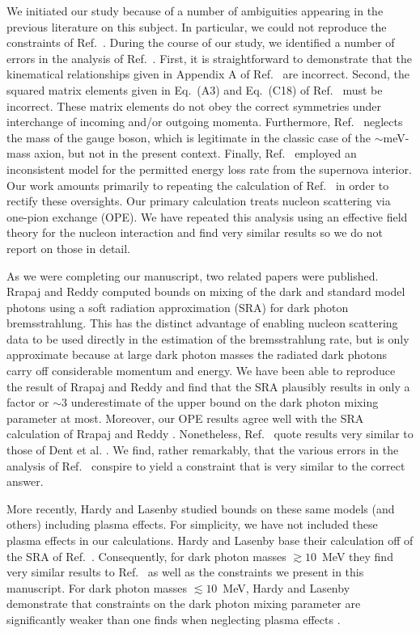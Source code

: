 \documentclass[nofootinbib,prd,superscriptaddress,twocolumn]{revtex4}
\begin{document}
We initiated our study because of a number of ambiguities appearing in the previous literature on this subject. 
In particular, we could not reproduce the constraints of Ref.~\cite{dent_etal12}. During the course of our 
study, we identified a number of errors in the analysis of Ref.~\cite{dent_etal12}. First, it is straightforward 
to demonstrate that the kinematical relationships given in Appendix A of Ref.~\cite{dent_etal12} are 
incorrect. Second, the squared matrix elements given in Eq.~(A3) and Eq.~(C18) of Ref.~\cite{dent_etal12} must 
be incorrect. These matrix elements do not obey the correct symmetries under interchange of incoming 
and/or outgoing momenta. Furthermore, Ref.~\cite{dent_etal12} neglects the mass of the gauge boson, which 
is legitimate in the classic case of the $\sim$meV-mass axion, but not in the present context. Finally, Ref.~\cite{dent_etal12} 
employed an inconsistent model for the permitted energy loss rate from the supernova interior. Our work amounts 
primarily to repeating the calculation of Ref.~\cite{dent_etal12} in order to rectify these oversights. Our primary 
calculation treats nucleon scattering via one-pion exchange (OPE). We have repeated this analysis 
using an effective field theory for the nucleon interaction and find very similar results so we do not 
report on those in detail.


As we were completing our manuscript, two related papers were published. Rrapaj and Reddy \cite{rrapaj_reddy16} 
computed bounds on mixing of the dark and standard model photons using a soft radiation approximation (SRA) 
for dark photon bremsstrahlung. This has the distinct advantage of enabling nucleon scattering data to be used 
directly in the estimation of the bremsstrahlung rate, but is only approximate because at large dark photon masses 
the radiated dark photons carry off considerable momentum and energy. We have been able to reproduce the 
result of Rrapaj and Reddy \cite{rrapaj_reddy16} and find that the SRA plausibly results in only a factor or 
$\sim 3$ underestimate of the upper bound on the dark photon mixing parameter at most. Moreover, 
our OPE results agree well with the SRA calculation of Rrapaj and Reddy \cite{rrapaj_reddy16}. Nonetheless, 
Ref.~\cite{rrapaj_reddy16} quote results very similar to those of Dent et al. \cite{dent_etal12}. We find, 
rather remarkably, that the various errors in the analysis of Ref.~\cite{dent_etal12} conspire to yield a constraint that 
is very similar to the correct answer. 


More recently, Hardy and Lasenby \cite{hardy_lasenby17} studied bounds on these same models (and others) 
including plasma effects. For simplicity, we have not included these plasma effects in our calculations. Hardy 
and Lasenby base their calculation off of the SRA of Ref.~\cite{rrapaj_reddy16}. Consequently, 
for dark photon masses $\gtrsim 10$~MeV they find very similar results to Ref.~\cite{rrapaj_reddy16} as well 
as the constraints we present in this manuscript. For dark photon masses $\lesssim 10$~MeV, Hardy and 
Lasenby demonstrate that constraints on the dark photon mixing parameter are significantly weaker than 
one finds when neglecting plasma effects \cite{hardy_lasenby17}. 
\end{document}
